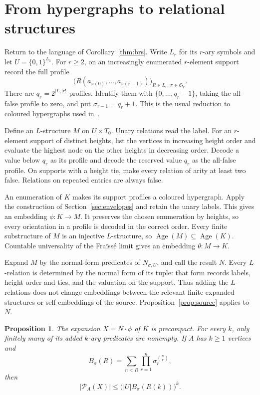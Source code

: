 \documentclass{article}
\numberwithin{equation}{section}
\newtheorem{proposition}[theorem]{Proposition}
\theoremstyle{definition}
\DeclareMathOperator{\Age}{Age}
\newcommand{\Sym}{\mathfrak S}
\begin{document}
\section{From hypergraphs to relational structures}\label{sec:profiles}

Return to the language of Corollary~\ref{thm:brs}. Write $L_r$ for its
$r$-ary symbols and let $U=\{0,1\}^{L_1}$. For $r\geq2$, on an increasingly
enumerated $r$-element support record the full profile
\[
\bigl(R(a_{\pi(0)},\ldots,a_{\pi(r-1)})\bigr)_{R\in L_r,\,\pi\in\Sym_r}.
\]
There are $q_r=2^{|L_r|r!}$ profiles. Identify them with $\{0,\ldots,q_r-1\}$,
taking the all-false profile to zero, and put $\sigma_{r-1}=q_r+1$.
This is the usual reduction to coloured hypergraphs
used in~\cite[Proposition~5.2]{InfiniteLanguages}.

Define an $L$-structure $M$ on $U\times T_0$. Unary relations read the
label. For an $r$-element support of distinct heights, list the vertices in
increasing height order and evaluate the highest node on the other heights
in decreasing order. Decode a value below $q_r$ as its profile and decode
the reserved value $q_r$ as the all-false profile. On supports with a height
tie, make every relation of arity at least two false. Relations on repeated
entries are always false.

An enumeration of $K$ makes its support profiles a coloured hypergraph.
Apply the construction of Section~\ref{sec:envelopes} and retain the unary
labels. This gives an embedding $\phi:K\to M$. It preserves the chosen
enumeration by heights, so every orientation in a profile is decoded in
the correct order. Every finite substructure of $M$ is an injective $L$-structure, so
$\Age(M)\subseteq\Age(K)$. Countable universality of the Fra\"iss\'e
limit gives an embedding $\theta:M\to K$.

Expand $M$ by the normal-form predicates of $N_{\sigma,U}$, and call the
result $N$. Every $L$-relation is determined by the normal form of its
tuple: that form records labels, height order and ties, and the valuation
on the support. Thus adding the $L$-relations does not change embeddings
between the relevant finite expanded structures or self-embeddings of the
source. Proposition~\ref{prop:source} applies to $N$.

\begin{proposition}\label{prop:precompact}
The expansion $X=N\cdot\phi$ of $K$ is precompact. For every $k$, only
finitely many of its added $k$-ary predicates are nonempty. If $A$ has
$k\geq1$ vertices and
\[
B_\sigma(R)=\sum_{n<R}\prod_{r=1}^n\sigma_r^{\binom nr},
\]
then
\begin{equation}\label{eq:crude-bound}
|\mathcal P_A(X)|\leq\bigl(|U|B_\sigma(R(k))\bigr)^k.
\end{equation}
\end{proposition}
\end{document}
